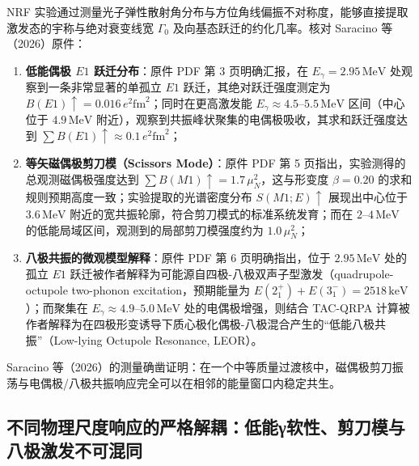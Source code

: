 NRF 实验通过测量光子弹性散射角分布与方位角线偏振不对称度，能够直接提取激发态的宇称与绝对衰变线宽 $\Gamma_0$ 及向基态跃迁的约化几率。核对 Saracino 等（2026）原件：
\begin{enumerate}
\item \textbf{低能偶极 $E1$ 跃迁分布}：原件 PDF 第 3 页明确汇报，在 $E_\gamma = 2.95\,\mathrm{MeV}$ 处观察到一条非常显著的单孤立 $E1$ 跃迁，其绝对跃迁强度测定为 $B(E1)\uparrow = 0.016\,e^2\mathrm{fm}^2$；同时在更高激发能 $E_\gamma \approx 4.5\text{--}5.5\,\mathrm{MeV}$ 区间（中心位于 $4.9\,\mathrm{MeV}$ 附近），观察到共振峰状聚集的电偶极吸收，其求和跃迁强度达到 $\sum B(E1)\uparrow \approx 0.1\,e^2\mathrm{fm}^2$；
\item \textbf{等矢磁偶极剪刀模（Scissors Mode）}：原件 PDF 第 5 页指出，实验测得的总观测磁偶极强度达到 $\sum B(M1)\uparrow = 1.7\,\mu_N^2$，这与形变度 $\beta = 0.20$ 的求和规则预期高度一致；实验提取的光谱密度分布 $S(M1; E)\uparrow$ 展现出中心位于 $3.6\,\mathrm{MeV}$ 附近的宽共振轮廓，符合剪刀模式的标准系统发育；而在 $2\text{--}4\,\mathrm{MeV}$ 的低能局域区间，观测到的局部剪刀模强度约为 $1.0\,\mu_N^2$；
\item \textbf{八极共振的微观模型解释}：原件 PDF 第 6 页明确指出，位于 $2.95\,\mathrm{MeV}$ 处的孤立 $E1$ 跃迁被作者解释为可能源自四极-八极双声子型激发（quadrupole-octupole two-phonon excitation，预期能量为 $E(2^+_1) + E(3^-_1) = 2518\,\mathrm{keV}$）；而聚集在 $E_\gamma \approx 4.9\text{--}5.0\,\mathrm{MeV}$ 处的电偶极增强，则结合 TAC-QRPA 计算被作者解释为在四极形变诱导下质心极化偶极-八极混合产生的``低能八极共振''（Low-lying Octupole Resonance, LEOR）。
\end{enumerate}
Saracino 等（2026）的测量确凿证明：在一个中等质量过渡核中，磁偶极剪刀振荡与电偶极/八极共振响应完全可以在相邻的能量窗口内稳定共生。

\subsection{不同物理尺度响应的严格解耦：低能γ软性、剪刀模与八极激发不可混同}\label{sec:4-3-5}

